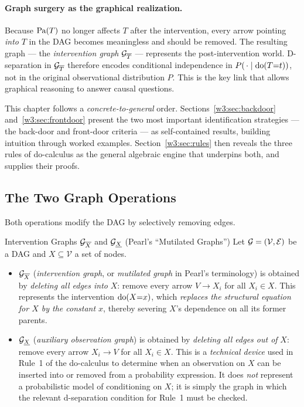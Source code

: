 \documentclass[master.tex]{subfiles}
\begin{document}
\paragraph{Graph surgery as the graphical realization.}
Because $\mathrm{Pa}(T)$ no longer affects $T$ after the intervention, every arrow
pointing \emph{into} $T$ in the DAG becomes meaningless and should be
removed.  The resulting graph --- the \emph{intervention graph}
$\mathcal{G}_{\overline{T}}$ --- represents the post-intervention world.
D-separation in $\mathcal{G}_{\overline{T}}$ therefore encodes conditional
independence in $P(\,\cdot \mid \mathrm{do}(T{=}t))$, not in the original
observational distribution $P$.  This is the key link that allows
graphical reasoning to answer causal questions.

This chapter follows a \emph{concrete-to-general} order.
Sections~\ref{w3:sec:backdoor} and~\ref{w3:sec:frontdoor}
present the two most important identification strategies --- the back-door and
front-door criteria --- as self-contained results, building intuition through
worked examples.  Section~\ref{w3:sec:rules} then reveals the three rules of
do-calculus as the general algebraic engine that underpins both, and supplies
their proofs.

\subsection{The Two Graph Operations}
\label{w3:sec:operations}
Both operations modify the DAG by selectively removing edges.

\begin{defn}{Intervention Graphs $\mathcal{G}_{\overline{X}}$ and $\mathcal{G}_{\underline{X}}$ (Pearl's ``Mutilated Graphs'')}
Let $\mathcal{G} = (\mathcal{V}, \mathcal{E})$ be a DAG and $X \subseteq
\mathcal{V}$ a set of nodes.
\begin{itemize}
  \item $\mathcal{G}_{\overline{X}}$ (\emph{intervention graph}, or
        \emph{mutilated graph} in Pearl's terminology) is obtained by
        \emph{deleting all edges into} $X$: remove every arrow
        $V \to X_i$ for all $X_i \in X$.
        This represents the intervention $\mathrm{do}(X{=}x)$, which
        \emph{replaces the structural equation for $X$ by the constant $x$},
        thereby severing $X$'s dependence on all its former parents.
  \item $\mathcal{G}_{\underline{X}}$ (\emph{auxiliary observation graph}) is
        obtained by \emph{deleting all edges out of} $X$: remove every
        arrow $X_i \to V$ for all $X_i \in X$.
        This is a \emph{technical device} used in Rule~1 of the do-calculus
        to determine when an observation on $X$ can be inserted into or
        removed from a probability expression.  It does \emph{not} represent
        a probabilistic model of conditioning on $X$; it is simply the graph
        in which the relevant d-separation condition for Rule~1 must be
        checked.
\end{itemize}
\end{defn}
\end{document}
